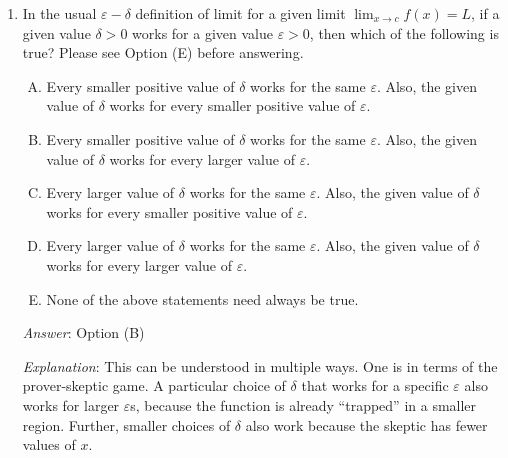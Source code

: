 \documentclass[10pt]{amsart}
\begin{document}
\begin{enumerate}
  {\em Answer}: Option (C)

  {\em Explanation}: Our statement should be that {\em every} $c$ has
  no limit. In other words, for {\em every} $c$ and {\em every} $L$,
  it is {\em not} true that $\displaystyle \lim_{x \to c} f(x) =
  L$. That's exactly what option (C) says.

  {\em Performance review}: $20$ out of $27$ got this. $4$ chose (A),
  $1$ each chose (B), (D), and (E).

  {\em Historical note (last time)}: $20$ out of $49$ people got this
  correct. $15$ chose (B), $7$ chose (E), $4$ chose (D), $3$ chose
  (A).


\item In the usual $\varepsilon-\delta$ definition of limit for a
  given limit $\displaystyle \lim_{x \to c} f(x) = L$, if a given
  value $\delta > 0$ works for a given value $\varepsilon > 0$, then
  which of the following is true? Please see Option (E) before
  answering.

  \begin{enumerate}[(A)]
  \item Every smaller positive value of $\delta$ works for the same
    $\varepsilon$. Also, the given value of $\delta$ works for every
    smaller positive value of $\varepsilon$.
  \item Every smaller positive value of $\delta$ works for the same
    $\varepsilon$. Also, the given value of $\delta$ works for every
    larger value of $\varepsilon$.
  \item Every larger value of $\delta$ works for the same
    $\varepsilon$. Also, the given value of $\delta$ works for every
    smaller positive value of $\varepsilon$.
  \item Every larger value of $\delta$ works for the same
    $\varepsilon$. Also, the given value of $\delta$ works for every
    larger value of $\varepsilon$.
  \item None of the above statements need always be true.
  \end{enumerate}

  {\em Answer}: Option (B)

  {\em Explanation}: This can be understood in multiple ways. One is
  in terms of the prover-skeptic game. A particular choice of $\delta$
  that works for a specific $\varepsilon$ also works for larger
  $\varepsilon$s, because the function is already ``trapped'' in a
  smaller region. Further, smaller choices of $\delta$ also work
  because the skeptic has fewer values of $x$.


\end{enumerate}
\end{document}
